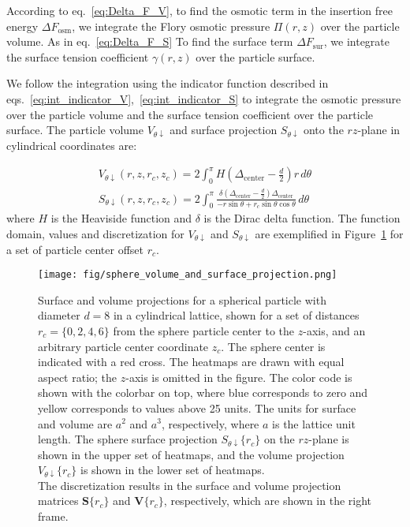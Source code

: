\documentclass[10pt, a4paper]{article}
\begin{document}
\begin{multicols}{2}
According to eq.~\ref{eq:Delta_F_V}, to find the osmotic term in the insertion free energy $\Delta F_{\textrm{osm}}$, we integrate the Flory osmotic pressure $\Pi(r, z)$ over the particle volume.
As in eq.~\ref{eq:Delta_F_S} To find the surface term $\Delta F_{\textrm{sur}}$, we integrate the surface tension coefficient $\gamma(r, z)$ over the particle surface.

We follow the integration using the indicator function described in eqs.~\ref{eq:int_indicator_V},~\ref{eq:int_indicator_S} to integrate the osmotic pressure over the particle volume and the surface tension coefficient over the particle surface.
The particle volume $V_{\theta \downarrow}$ and surface projection $S_{\theta \downarrow}$ onto the $rz$-plane in cylindrical coordinates are:

\begin{gather}
    V_{\theta \downarrow}(r, z, r_c, z_c) = 2\int_{0}^{\pi} H\left( \Delta_{\textrm{center}} - \frac{d}{2} \right) r \, d\theta
    \\
    S_{\theta \downarrow}(r, z, r_c, z_c) = 2\int_{0}^{\pi} \frac{\delta \left( \Delta_{\textrm{center}} - \frac{d}{2} \right) \Delta_{\textrm{center}}}{-r \sin \theta + r_c \sin \theta \cos \theta} \, d\theta
\end{gather}
where $H$ is the Heaviside function and $\delta$ is the Dirac delta function.
The function domain, values and discretization for $V_{\theta \downarrow}$ and $S_{\theta \downarrow}$ are exemplified in Figure~\ref{fig:sphere_volume_and_surface_projection} for a set of particle center offset $r_c$.

\begin{figure}[H]
    \centering
    \texttt{[image: fig/sphere\_volume\_and\_surface\_projection.png]}
    \caption{
        Surface and volume projections for a spherical particle with diameter $d = 8$ in a cylindrical lattice, shown for a set of distances $r_c = \{0, 2, 4, 6\}$ from the sphere particle center to the $z$-axis, and an arbitrary particle center coordinate $z_c$.
        The sphere center is indicated with a red cross.
        The heatmaps are drawn with equal aspect ratio; the $z$-axis is omitted in the figure.
        The color code is shown with the colorbar on top, where blue corresponds to zero and yellow corresponds to values above 25 units.
        The units for surface and volume are $a^2$ and $a^3$, respectively, where $a$ is the lattice unit length.
        The sphere surface projection $S_{\theta \downarrow}\{r_c\}$ on the $rz$-plane is shown in the upper set of heatmaps, and the volume projection $V_{\theta \downarrow}\{r_c\}$ is shown in the lower set of heatmaps.
        \\
        The discretization results in the surface and volume projection matrices $\bm{S}\{r_c\}$ and $\bm{V}\{r_c\}$, respectively, which are shown in the right frame.
    }
    \label{fig:sphere_volume_and_surface_projection}
\end{figure}


\end{multicols}
\end{document}
